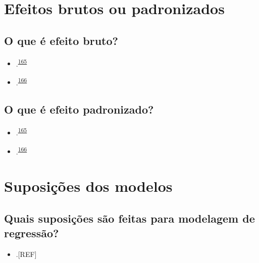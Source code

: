 \documentclass[
  a4paper,
]{book}
\providecommand{\tightlist}{%
  \setlength{\itemsep}{0pt}\setlength{\parskip}{0pt}}
\begin{document}
\hypertarget{suposicoes-modelos}{%
\section{Efeitos brutos ou padronizados}\label{suposicoes-modelos}}

\hypertarget{o-que-uxe9-efeito-bruto}{%
\subsection{O que é efeito bruto?}\label{o-que-uxe9-efeito-bruto}}

\begin{itemize}
\item
  .\textsuperscript{\protect\hyperlink{ref-greenland1986}{165}}
\item
  .\textsuperscript{\protect\hyperlink{ref-greenland1991}{166}}
\end{itemize}

\hypertarget{o-que-uxe9-efeito-padronizado}{%
\subsection{O que é efeito padronizado?}\label{o-que-uxe9-efeito-padronizado}}

\begin{itemize}
\item
  .\textsuperscript{\protect\hyperlink{ref-greenland1986}{165}}
\item
  .\textsuperscript{\protect\hyperlink{ref-greenland1991}{166}}
\end{itemize}

\hypertarget{suposiuxe7uxf5es-dos-modelos}{%
\section{Suposições dos modelos}\label{suposiuxe7uxf5es-dos-modelos}}

\hypertarget{quais-suposiuxe7uxf5es-suxe3o-feitas-para-modelagem-de-regressuxe3o}{%
\subsection{Quais suposições são feitas para modelagem de regressão?}\label{quais-suposiuxe7uxf5es-suxe3o-feitas-para-modelagem-de-regressuxe3o}}

\begin{itemize}
\tightlist
\item
  .{[}REF{]}
\end{itemize}
\end{document}
